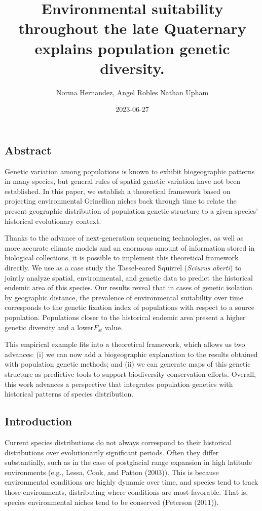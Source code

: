 \documentclass[
]{article}
\title{Environmental suitability throughout the late Quaternary explains
population genetic diversity.}
\author{Norma Hernandez, Angel Robles Nathan Upham}
\date{2023-06-27}
\begin{document}
\maketitle

\hypertarget{abstract}{%
\subsection{Abstract}\label{abstract}}

Genetic variation among populations is known to exhibit biogeographic
patterns in many species, but general rules of spatial genetic variation
have not been established. In this paper, we establish a theoretical
framework based on projecting environmental Grinellian niches back
through time to relate the present geographic distribution of population
genetic structure to a given species' historical evolutionary context.

Thanks to the advance of next-generation sequencing technologies, as
well as more accurate climate models and an enormous amount of
information stored in biological collections, it is possible to
implement this theoretical framework directly. We use as a case study
the Tassel-eared Squirrel (\emph{Sciurus aberti}) to jointly analyze
spatial, environmental, and genetic data to predict the historical
endemic area of this species. Our results reveal that in cases of
genetic isolation by geographic distance, the prevalence of
environmental suitability over time corresponds to the genetic fixation
index of populations with respect to a source population. Populations
closer to the historical endemic area present a higher genetic diversity
and a lower\(F_{st}\) value.

This empirical example fits into a theoretical framework, which allows
us two advances: (i) we can now add a biogeographic explanation to the
results obtained with population genetic methods; and (ii) we can
generate maps of this genetic structure as predictive tools to support
biodiversity conservation efforts. Overall, this work advances a
perspective that integrates population genetics with historical patterns
of species distribution.

\hypertarget{introduction}{%
\subsection{Introduction}\label{introduction}}

Current species distributions do not always correspond to their
historical distributions over evolutionarily significant periods. Often
they differ substantially, such as in the case of postglacial range
expansion in high latitude environments (e.g., Lessa, Cook, and Patton
(2003)). This is because environmental conditions are highly dynamic
over time, and species tend to track those environments, distributing
where conditions are most favorable. That is, species environmental
niches tend to be conserved (Peterson (2011)).
\end{document}
